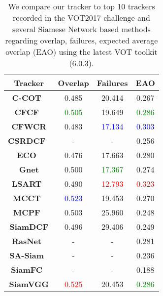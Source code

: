 \documentclass[runningheads]{llncs}
\begin{document}
\setlength{\tabcolsep}{20pt}
\begin{table}
\begin{center}
\caption{We compare our tracker to top 10 trackers recorded in the VOT2017 challenge and several Siamese Network based methods regarding overlap, failures, expected average overlap (EAO) using the latest VOT toolkit (6.0.3).}
\label{table:vot2017}
\begin{tabular}{cccc}
\hline


\textbf{Tracker}&\textbf{Overlap} & \textbf{Failures} & \textbf{EAO} \\\hline

\textbf{C-COT~\cite{danelljan2016beyond}} & 0.485 & 20.414 & 0.267  \\
\textbf{CFCF~\cite{danelljan2015convolutional}} & \textcolor{green}{0.505} & 19.649 & \textcolor{green}{0.286} \\
\textbf{CFWCR} & 0.483 & \textcolor{blue}{17.134} & \textcolor{blue}{0.303}  \\
\textbf{CSRDCF~\cite{lukezic2017discriminative}} & - & - & 0.256\\
\textbf{ECO~\cite{danelljan2017eco}} & 0.476 & 17.663 & 0.280 \\
\textbf{Gnet} & 0.500 & \textcolor{green}{17.367} & 0.274\\
\textbf{LSART~\cite{sun2018learning}} & 0.490 & \textcolor{red}{12.793} & \textcolor{red}{0.323}  \\
\textbf{MCCT~\cite{wang2018multi}} & \textcolor{blue}{0.523} & 19.453 & 0.270  \\
\textbf{MCPF~\cite{zhang2017multi}} & 0.503 & 25.960 & 0.248  \\
\textbf{SiamDCF} & 0.496 & 29.406 & 0.249  \\\hline

\textbf{RasNet~\cite{wang2018learning}} & - & - & 0.281  \\

\textbf{SA-Siam~\cite{he2018twofold}} & - & - & 0.236  \\
\textbf{SiamFC~\cite{bertinetto2016fully}} & - & - & 0.188  \\\hline

\textbf{SiamVGG} & \textcolor{red}{0.525} & 20.453 & \textcolor{green}{0.286} \\\hline
\end{tabular}
\end{center}
\end{table}
\setlength{\tabcolsep}{1.4pt}
\end{document}
